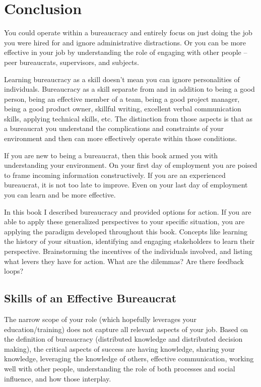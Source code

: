 \chapter{Conclusion\label{sec:last-chapter}}

You could operate within a bureaucracy and entirely focus on just doing the job you were hired for and ignore administrative distractions. Or you can be more effective in your job by understanding the role of engaging with other people -- peer bureaucrats, supervisors, and subjects. 

Learning bureaucracy as a skill doesn't mean you can ignore personalities of individuals. Bureaucracy as a skill separate from and in addition to being a good person, being an effective member of a team, being a good project manager, being a good product owner, skillful writing, excellent verbal communication skills, applying technical skills, etc. The distinction from those aspects is that as a bureaucrat you understand the complications and constraints of your environment and then can more effectively operate within those conditions.

If you are new to being a bureaucrat, then this book armed you with understanding your environment. On your first day of employment you are poised to frame incoming information constructively.
If you are an experienced bureaucrat, it is not too late to improve. Even on your last day of employment you can learn and be more effective.

In this book I described bureaucracy and provided options for action. If you are able to apply these generalized perspectives to your specific situation, you are applying the paradigm developed throughout this book. Concepts like learning the history of your situation, identifying and engaging stakeholders to learn their perspective. Brainstorming the incentives of the individuals involved, and listing what levers they have for action. What are the dilemmas? Are there feedback loops?


\section{Skills of an Effective Bureaucrat}

The narrow scope of your role (which hopefully leverages your education/training) does not capture all relevant aspects of your job. 
Based on the definition of bureaucracy (distributed knowledge and distributed decision making), the critical aspects of success are having knowledge, sharing your knowledge, leveraging the knowledge of others, effective communication, working well with other people, understanding the role of both processes and social influence, and how those interplay. 


